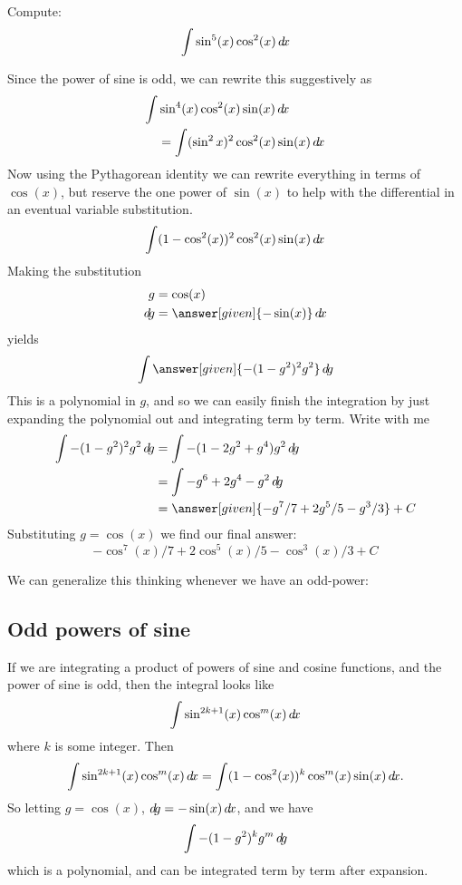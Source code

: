 \documentclass{ximera}
\begin{document}
\begin{example}
  Compute:
  \[
  \int \sin^5(x) \cos^2(x) \mathop{}\!d\! x
  \]
  \begin{explanation}
    Since the power of sine is odd, we can rewrite this suggestively as
    \begin{align*}
    \int &\sin^4(x) \cos^2(x) \sin(x) \mathop{}\!d\! x \\
    &= \int (\sin^2x)^2 \cos^2(x) \sin(x) \mathop{}\!d\! x
    \end{align*}
    Now using the Pythagorean identity we can rewrite everything in
    terms of $\cos(x)$, but reserve the one power of $\sin(x)$ to help
    with the differential in an eventual variable substitution.
    \[
    \int (1-\cos^2(x))^2 \cos^2(x) \sin(x) \mathop{}\!d\! x
    \]
    Making the substitution
    \begin{align*}
      g &= \cos(x)\\
      \d g &=\answer[given]{-\sin(x)} \d x
    \end{align*}
    yields
    \[
    \int \answer[given]{-(1-g^2)^2 g^2} \d g
    \]
    This is a polynomial in $g$, and so we can easily finish the
    integration by just expanding the polynomial out and integrating
    term by term. Write with me
    \begin{align*}
      \int {-(1-g^2)^2 g^2} \d g &= \int -(1-2g^2+g^4)g^2\d g\\
      &= \int-g^6 + 2g^4-g^2 \d g\\
      &=\answer[given]{-g^7/7 + 2g^5/5 - g^3/3}+C
    \end{align*}
    Substituting $g = \cos(x)$ we find our final answer:
    \[
    -\cos^7(x)/7 + 2\cos^5(x)/5 - \cos^3(x)/3+C
    \]
  \end{explanation}
\end{example}

We can generalize this thinking whenever we have an odd-power:

\subsection{Odd powers of sine}

If we are integrating a product of powers of sine and cosine
functions, and the power of sine is odd, then the integral looks like
\[
\int \sin^{2k+1}(x) \cos^m(x) \mathop{}\!d\! x
\]
where $k$ is some integer.  Then
\[
\int \sin^{2k+1}(x) \cos^m(x) \mathop{}\!d\! x = \int (1-\cos^2(x))^k \cos^m(x) \sin(x)\mathop{}\!d\! x.
\]
So letting $g = \cos(x)$, $\mathop{}\!d\! g =-\sin(x) \mathop{}\!d\! x$, and we have
\[
\int -(1-g^2)^k g^m \mathop{}\!d\! g
\]
which is a polynomial, and can be integrated term by term after
expansion.
\end{document}
